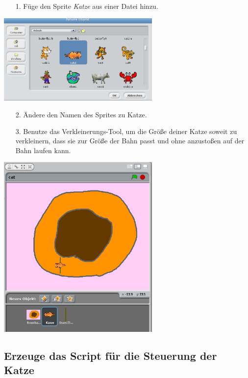 \begin{itemize}
\item[1.] Füge den Sprite \emph{Katze} aus einer Datei hinzu.
\end{itemize}
\includegraphics[width=0.6\textwidth]{images/aufgabe4_katze_sprite.png}
\begin{itemize}
\item[2. ] Ändere den Namen des Sprites zu Katze.
\end{itemize}
\begin{itemize}
\item[3.] Benutze das Verkleinerungs-Tool, um die Größe deiner Katze soweit zu verkleinern, dass sie zur Größe der Bahn passt und ohne anzustoßen auf der Bahn laufen kann.
\end{itemize}
\includegraphics[width=0.6\textwidth]{images/aufgabe4_katze_schrumpfen.png}

\subsection{Erzeuge das Script für die Steuerung der Katze}

